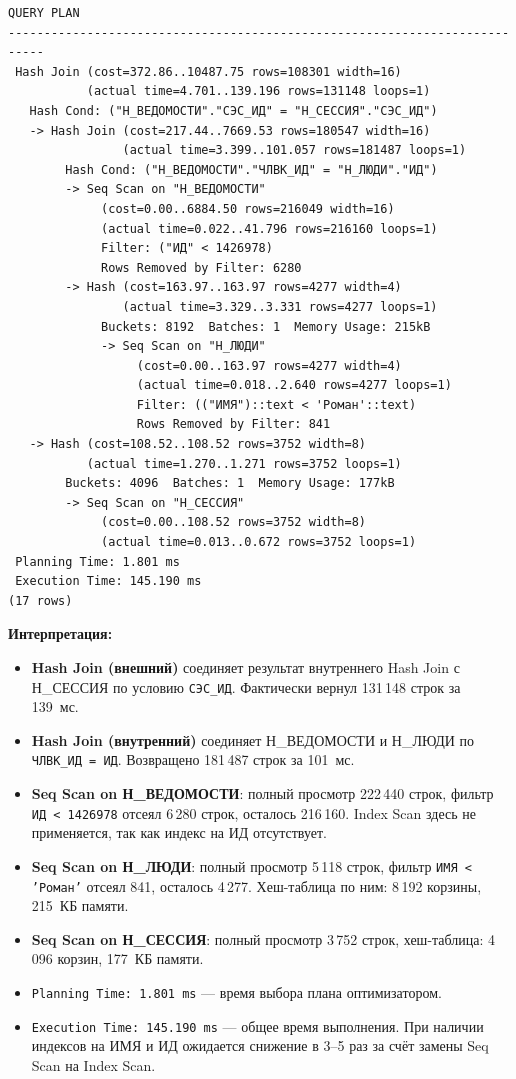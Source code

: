 \documentclass[12pt,a4paper]{article}
\begin{document}
\begin{lstlisting}[style=planstyle, basicstyle=\ttfamily\fontsize{7pt}{8.5pt}\selectfont]
                                  QUERY PLAN
---------------------------------------------------------------------------
 Hash Join (cost=372.86..10487.75 rows=108301 width=16)
           (actual time=4.701..139.196 rows=131148 loops=1)
   Hash Cond: ("Н_ВЕДОМОСТИ"."СЭС_ИД" = "Н_СЕССИЯ"."СЭС_ИД")
   -> Hash Join (cost=217.44..7669.53 rows=180547 width=16)
                (actual time=3.399..101.057 rows=181487 loops=1)
        Hash Cond: ("Н_ВЕДОМОСТИ"."ЧЛВК_ИД" = "Н_ЛЮДИ"."ИД")
        -> Seq Scan on "Н_ВЕДОМОСТИ"
             (cost=0.00..6884.50 rows=216049 width=16)
             (actual time=0.022..41.796 rows=216160 loops=1)
             Filter: ("ИД" < 1426978)
             Rows Removed by Filter: 6280
        -> Hash (cost=163.97..163.97 rows=4277 width=4)
                (actual time=3.329..3.331 rows=4277 loops=1)
             Buckets: 8192  Batches: 1  Memory Usage: 215kB
             -> Seq Scan on "Н_ЛЮДИ"
                  (cost=0.00..163.97 rows=4277 width=4)
                  (actual time=0.018..2.640 rows=4277 loops=1)
                  Filter: (("ИМЯ")::text < 'Роман'::text)
                  Rows Removed by Filter: 841
   -> Hash (cost=108.52..108.52 rows=3752 width=8)
           (actual time=1.270..1.271 rows=3752 loops=1)
        Buckets: 4096  Batches: 1  Memory Usage: 177kB
        -> Seq Scan on "Н_СЕССИЯ"
             (cost=0.00..108.52 rows=3752 width=8)
             (actual time=0.013..0.672 rows=3752 loops=1)
 Planning Time: 1.801 ms
 Execution Time: 145.190 ms
(17 rows)
\end{lstlisting}

\textbf{Интерпретация:}
\begin{itemize}
  \item \textbf{Hash Join (внешний)} соединяет результат внутреннего Hash Join
        с Н\_СЕССИЯ по условию \texttt{СЭС\_ИД}. Фактически вернул 131\,148 строк
        за 139~мс.
  \item \textbf{Hash Join (внутренний)} соединяет Н\_ВЕДОМОСТИ и Н\_ЛЮДИ по
        \texttt{ЧЛВК\_ИД = ИД}. Возвращено 181\,487 строк за 101~мс.
  \item \textbf{Seq Scan on Н\_ВЕДОМОСТИ}: полный просмотр 222\,440 строк,
        фильтр \texttt{ИД < 1426978} отсеял 6\,280 строк, осталось 216\,160.
        Index Scan здесь не применяется, так как индекс на ИД отсутствует.
  \item \textbf{Seq Scan on Н\_ЛЮДИ}: полный просмотр 5\,118 строк,
        фильтр \texttt{ИМЯ < 'Роман'} отсеял 841, осталось 4\,277.
        Хеш-таблица по ним: 8\,192 корзины, 215~КБ памяти.
  \item \textbf{Seq Scan on Н\_СЕССИЯ}: полный просмотр 3\,752 строк,
        хеш-таблица: 4\,096 корзин, 177~КБ памяти.
  \item \texttt{Planning Time: 1.801 ms} --- время выбора плана оптимизатором.
  \item \texttt{Execution Time: 145.190 ms} --- общее время выполнения.
        При наличии индексов на ИМЯ и ИД ожидается снижение в 3--5 раз за счёт
        замены Seq Scan на Index Scan.
\end{itemize}
\end{document}
